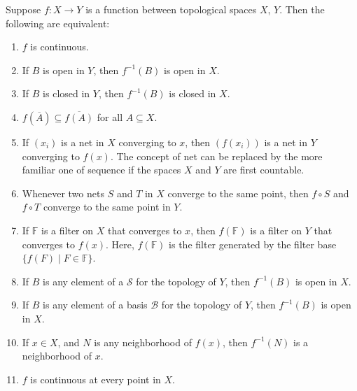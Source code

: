 \documentclass[12pt]{article}
\def\closure{\overline}
\begin{document}
Suppose $f\colon X\to Y$ is a function between topological spaces
$X$, $Y$. Then the following are equivalent:
\begin{enumerate}
\item $f$ is continuous.
\item If $B$ is open in $Y$, then $f^{-1}(B)$ is open in $X$.
\item If $B$ is closed in $Y$, then $f^{-1}(B)$ is closed in $X$. 
\item $f\!\left(\closure{A}\right)\subseteq\closure{f(A)}$
  for all $A\subseteq X$.
\item If $(x_i)$ is a net in $X$ converging to $x$, then 
  $(f(x_i))$ is a net in $Y$ converging to $f(x)$. The concept of net
  can be replaced by the more familiar one of sequence if the spaces
  $X$ and $Y$ are first countable.
\item Whenever two nets $S$ and $T$ in $X$ converge to the same point, then $f \circ S$ and $f \circ T$
converge to the same point in $Y$.
\item If $\mathbb{F}$ is a filter on $X$ that converges to $x$, then $f(\mathbb{F})$ is a filter on $Y$ that converges to $f(x)$.  Here, $f(\mathbb{F})$ is the filter generated by the filter base $\lbrace f(F)\mid F\in \mathbb{F}\rbrace$.
\item If $B$ is any element of a  $\mathcal{S}$ for the topology of $Y$,
  then $f^{-1}(B)$ is open in $X$.
\item If $B$ is any element of a basis $\mathcal{B}$ for the topology of $Y$, then $f^{-1}(B)$ is open in $X$.
\item If $x \in X$, and $N$ is any neighborhood of $f(x)$, then $f^{-1}(N)$ is a neighborhood of $x$.
\item $f$ is continuous at every point in $X$.
\end{enumerate}
\end{document}
